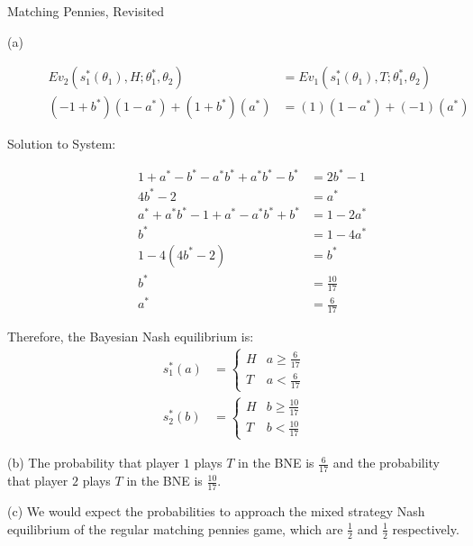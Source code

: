 \documentclass[9pt]{extarticle}
\begin{document}
\begin{problem}{Matching Pennies, Revisited}
\begin{problem}{(a)}
\begin{description}
          \begin{align*}
            Ev_{2}(s_1^{\ast}(\theta_1),H;\theta_1^{\ast},\theta_2) &= Ev_{1}(s_1^{\ast}(\theta_1),T;\theta_1^{\ast},\theta_2)\\
            (-1+b^{\ast})(1-a^{\ast}) + (1+b^{\ast})(a^{\ast}) &= (1)(1-a^{\ast}) + (-1)(a^{\ast})
          \end{align*}
        \item[Solution to System:]
          \begin{align*}
            1 + a^{\ast} - b^{\ast} - a^{\ast}b^{\ast} + a^{\ast}b^{\ast} - b^{\ast} &= 2b^{\ast} - 1\tag*{Player 1 Indifference Condition}\\
            4b^{\ast} - 2 &= a^{\ast}\\
            a^{\ast} + a^{\ast}b^{\ast} - 1 + a^{\ast} - a^{\ast}b^{\ast} + b^{\ast} &= 1-2a^{\ast}\tag*{Player 2 Indifference Condition}\\
            b^{\ast} &= 1-4a^{\ast}\\
            1-4(4b^{\ast} - 2) &= b^{\ast}\\
            b^{\ast} &= \frac{10}{17}\\
            a^{\ast} &= \frac{6}{17}
          \end{align*}
      \end{description}
      Therefore, the Bayesian Nash equilibrium is:
      \begin{align*}
        s_1^{\ast}(a) &= \begin{cases}
          H & a\geq \frac{6}{17}\\
          T & a < \frac{6}{17}
        \end{cases}\\
          s_2^{\ast}(b) &= \begin{cases}
            H & b\geq \frac{10}{17}\\
            T & b < \frac{10}{17}
          \end{cases}
      \end{align*}
    \end{problem}
    \begin{problem}{(b)}
      The probability that player $1$ plays $T$ in the BNE is $\frac{6}{17}$ and the probability that player $2$ plays $T$ in the BNE is $\frac{10}{17}$.
    \end{problem}
    \begin{problem}{(c)}
      We would expect the probabilities to approach the mixed strategy Nash equilibrium of the regular matching pennies game, which are $\frac{1}{2}$ and $\frac{1}{2}$ respectively.
    \end{problem}
  \end{problem}
\end{document}
